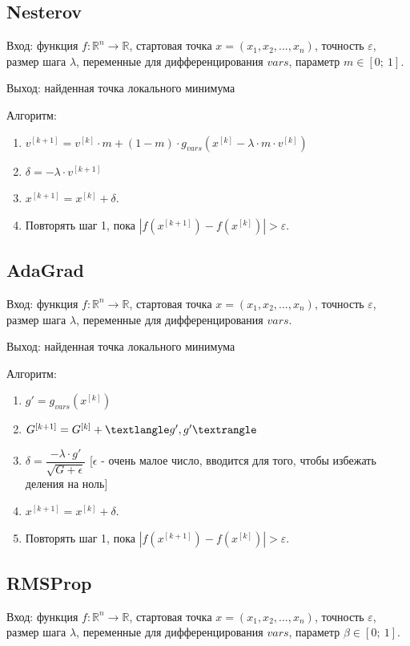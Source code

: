 \documentclass[a4paper,14pt,oneside,openany]{memoir}
\begin{document}
\subsection{Nesterov}
Вход: функция $f:\mathbb{R}^n \rightarrow \mathbb{R}$, стартовая точка $x = (x_1,x_2,...,x_n)$, точность $\varepsilon$, размер шага $\lambda$, переменные для дифференцирования $vars$, параметр $m \in [0;\ 1]$.

Выход: найденная точка локального минимума

Алгоритм:
\begin{enumerate}
	\item $v ^{[k+1]} = v^{[k]} \cdot m + (1 - m) \cdot g_{vars}(x^{[k]} - \lambda \cdot m \cdot v^{[k]})$ 
	\item $\delta = - \lambda \cdot v ^{[k+1]}$
	\item $x^{[k+1]} = x^{[k]} + \delta$.
	\item Повторять шаг 1, пока  $|f(x^{[k+1]}) - f(x^{[k]})| > \varepsilon$.
\end{enumerate}

\subsection{AdaGrad}
Вход: функция $f:\mathbb{R}^n \rightarrow \mathbb{R}$, стартовая точка $x = (x_1,x_2,...,x_n)$, точность $\varepsilon$, размер шага $\lambda$, переменные для дифференцирования $vars$.

Выход: найденная точка локального минимума

Алгоритм:
\begin{enumerate}
	\item $g' = g_{vars}(x^{[k]})$
	\item $G^{[k + 1]} = G^{[k]} + \textlangle g', g' \textrangle$
	\item $\delta = \dfrac{-\lambda \cdot g'}{\sqrt{G + \epsilon}} $ [$\epsilon$ - очень малое число, вводится для того, чтобы избежать деления на ноль]
	\item $x^{[k+1]} = x^{[k]} + \delta$.
	\item Повторять шаг 1, пока  $|f(x^{[k+1]}) - f(x^{[k]})| > \varepsilon$.
\end{enumerate}

\subsection{RMSProp}
Вход: функция $f:\mathbb{R}^n \rightarrow \mathbb{R}$, стартовая точка $x = (x_1,x_2,...,x_n)$, точность $\varepsilon$, размер шага $\lambda$, переменные для дифференцирования $vars$, параметр $\beta \in [0;\ 1]$.
\end{document}
